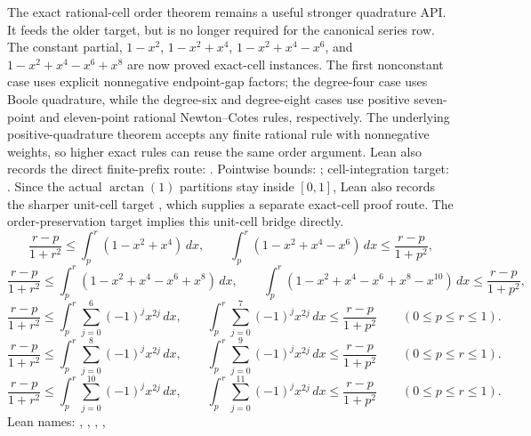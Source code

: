 \begin{theorem}
The exact rational-cell order theorem
remains a useful stronger quadrature API.  It feeds the older
target, but is no longer required for the canonical series row.
The constant partial, \(1-x^2\), \(1-x^2+x^4\),
\(1-x^2+x^4-x^6\), and \(1-x^2+x^4-x^6+x^8\) are now proved exact-cell
instances.  The first nonconstant case uses explicit nonnegative endpoint-gap
factors; the degree-four case uses Boole quadrature, while the degree-six and
degree-eight cases use positive seven-point and eleven-point rational
Newton--Cotes rules, respectively.  The underlying
positive-quadrature theorem accepts any finite rational rule with nonnegative
weights, so higher exact rules can reuse the same order argument.
Lean also records the direct finite-prefix route:
.
Pointwise bounds:
;
cell-integration target:
.
Since the actual \(\arctan(1)\) partitions stay inside \([0,1]\), Lean also
records the sharper unit-cell target
,
which supplies a separate exact-cell proof route.  The order-preservation
target implies this unit-cell bridge directly.
\[
  \frac{r-p}{1+r^2}
  \le
  \int_p^r (1-x^2+x^4)\,dx,
  \qquad
  \int_p^r (1-x^2+x^4-x^6)\,dx
  \le
  \frac{r-p}{1+p^2},
\]
\[
  \frac{r-p}{1+r^2}
  \le
  \int_p^r (1-x^2+x^4-x^6+x^8)\,dx,
  \qquad
  \int_p^r (1-x^2+x^4-x^6+x^8-x^{10})\,dx
  \le
  \frac{r-p}{1+p^2},
\]
\[
  \frac{r-p}{1+r^2}
  \le
  \int_p^r \sum_{j=0}^{6}(-1)^j x^{2j}\,dx,
  \qquad
  \int_p^r \sum_{j=0}^{7}(-1)^j x^{2j}\,dx
  \le
  \frac{r-p}{1+p^2}
  \qquad(0\le p\le r\le1).
\]
\[
  \frac{r-p}{1+r^2}
  \le
  \int_p^r \sum_{j=0}^{8}(-1)^j x^{2j}\,dx,
  \qquad
  \int_p^r \sum_{j=0}^{9}(-1)^j x^{2j}\,dx
  \le
  \frac{r-p}{1+p^2}
  \qquad(0\le p\le r\le1).
\]
\[
  \frac{r-p}{1+r^2}
  \le
  \int_p^r \sum_{j=0}^{10}(-1)^j x^{2j}\,dx,
  \qquad
  \int_p^r \sum_{j=0}^{11}(-1)^j x^{2j}\,dx
  \le
  \frac{r-p}{1+p^2}
  \qquad(0\le p\le r\le1).
\]
Lean names:
,
,
,
,

\end{theorem}
